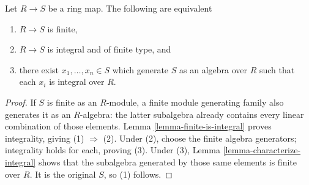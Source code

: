 \begin{lemma}
\label{lemma-characterize-finite-in-terms-of-integral}
Let $R \to S$ be a ring map. The following are equivalent
\begin{enumerate}
\item $R \to S$ is finite,
\item $R \to S$ is integral and of finite type, and
\item there exist $x_1, \ldots, x_n \in S$ which generate $S$ as an
algebra over $R$ such that each $x_i$ is integral over $R$.
\end{enumerate}
\end{lemma}

\begin{proof}
If $S$ is finite as an $R$-module, a finite module generating
family also generates it as an $R$-algebra: the latter subalgebra
already contains every linear combination of those elements.
Lemma \ref{lemma-finite-is-integral} proves integrality, giving
(1) $\Rightarrow$ (2). Under (2), choose the finite algebra
generators; integrality holds for each, proving (3).
Under (3), Lemma \ref{lemma-characterize-integral} shows that the
subalgebra generated by those same elements is finite over $R$.
It is the original $S$, so (1) follows.
\end{proof}